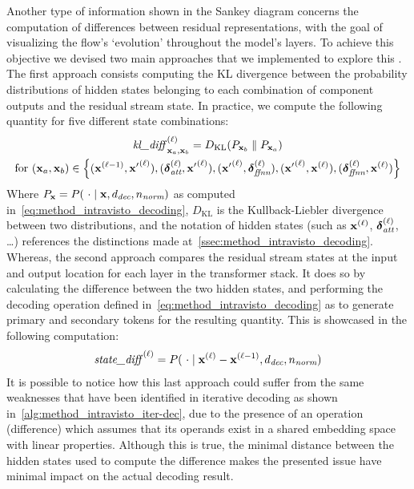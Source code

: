 Another type of information shown in the Sankey diagram concerns the computation of differences between residual representations, with the goal of visualizing the flow's `evolution' throughout the model's layers.
To achieve this objective we devised two main approaches that we implemented to explore this .
The first approach consists  computing the KL divergence between the probability distributions of hidden states belonging to each combination of component outputs and the residual stream state.
In practice, we compute the following quantity for five different state combinations:
\begin{equation}
    \label{eq:method_intravisto_kl-diff}
    \begin{gathered}
        {\textit{kl\_diff}{\,}\strut}_{\bm{\mathbf{x}}_a, \bm{\mathbf{x}}_b}^{(\ell)} = D_{\text{KL}}(P_{\bm{\mathbf{x}}_b} \parallel P_{\bm{\mathbf{x}}_a}) \\
        \text{for} \ (\bm{\mathbf{x}}_a, \bm{\mathbf{x}}_b) \in \Bigl\{
            (\bm{\mathbf{x}}^{(\ell-1)}, {\bm{\mathbf{x}}'}^{(\ell)}), 
            (\bm{\mathbf{\delta}}_\textit{att}^{(\ell)}, {\bm{\mathbf{x}}'}^{(\ell)}), 
            ({\bm{\mathbf{x}}'}^{(\ell)}, \bm{\mathbf{\delta}}_\textit{ffnn}^{(\ell)}), 
            ({\bm{\mathbf{x}}'}^{(\ell)}, \bm{\mathbf{x}}^{(\ell)}), 
            (\bm{\mathbf{\delta}}_\textit{ffnn}^{(\ell)}, \bm{\mathbf{x}}^{(\ell)})
        \Bigr\}
    \end{gathered}
\end{equation}
Where $P_{\bm{\mathbf{x}}} = P(\ \cdot \mid \bm{\mathbf{x}}, d_\textit{dec}, n_\textit{norm})$ as computed in~\cref{eq:method_intravisto_decoding}, $D_{\text{KL}}$ is the Kullback-Liebler divergence between two distributions, and the notation of hidden states (such as $\bm{\mathbf{x}}^{(\ell)}$, $\bm{\mathbf{\delta}}_\textit{att}^{(\ell)}$, \ldots) references the distinctions made at~\cref{ssec:method_intravisto_decoding}.
Whereas, the second approach compares the residual stream states at the input and output location for each layer in the transformer stack.
It does so by calculating the difference between the two hidden states, and performing the decoding operation defined in~\cref{eq:method_intravisto_decoding} as to generate primary and secondary tokens for the resulting quantity.
This is showcased in the following computation:
\begin{equation}
    \label{eq:method_intravisto_state-diff}
    {\textit{state\_diff}{\,}\strut}^{(\ell)} = P(\ \cdot \mid \bm{\mathbf{x}}^{(\ell)} - \bm{\mathbf{x}}^{(\ell - 1)}, d_\textit{dec}, n_\textit{norm})
\end{equation}
It is possible to notice how this last approach could suffer from the same weaknesses that have been identified in iterative decoding as shown in~\cref{alg:method_intravisto_iter-dec}, due to the presence of an operation (difference) which assumes that its operands exist in a shared embedding space with linear properties.
Although this is true, the minimal distance between the hidden states used to compute the difference makes the presented issue have minimal impact on the actual decoding result.


